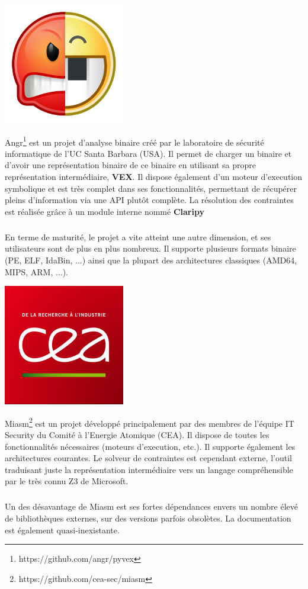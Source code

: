 \begin{center}
\includegraphics[scale=0.3]{angr.png}
\end{center}
Angr\footnote{https://github.com/angr/pyvex} est un projet d'analyse binaire créé par le laboratoire de sécurité informatique de l'UC Santa Barbara (USA).
Il permet de charger un binaire et d'avoir une représentation binaire de ce binaire en utilisant sa propre représentation intermédiaire, \textbf{VEX}.
Il dispose également d'un moteur d'execution symbolique et est très complet dans ses fonctionnalités, permettant de récupérer pleins d'information via
une API plutôt complète. La résolution des contraintes est réalisée grâce à un module interne nommé \textbf{Claripy}
\subparagraph{}
En terme de maturité, le projet a vite atteint une autre dimension, et ses utilisateurs sont de plus en plus nombreux. Il supporte plusieurs formats
binaire (PE, ELF, IdaBin, ...) ainsi que la plupart des architectures classiques (AMD64, MIPS, ARM, ...).

\begin{center}
\includegraphics[scale=0.3]{cea.png}
\end{center}
Miasm\footnote{https://github.com/cea-sec/miasm} est un projet développé principalement par des membres de l'équipe IT Security du Comité à l'Energie Atomique (CEA).
Il dispose de toutes les fonctionnalités nécessaires (moteurs d'execution, etc.). Il supporte également les architectures courantes. Le solveur de contraintes est
cependant externe, l'outil traduisant juste la représentation intermédiaire vers un langage compréhensible par le très connu Z3 de Microsoft.
\subparagraph{}
Un des désavantage de Miasm est ses fortes dépendances envers un nombre élevé de bibliothèques externes, sur des versions parfois obsolètes. La documentation est également
quasi-inexistante.

